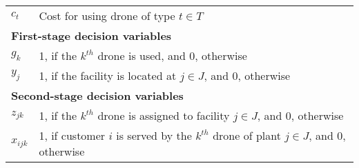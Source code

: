 \documentclass[preprint,review,11pt,authoryear]{elsarticle}
\begin{document}
\begin{table}[t]
{\begin{tabular}{ll}
$c_t$                             & Cost for using drone of type $t\in T$                                                     \\
\multicolumn{2}{l}{\textbf{First-stage decision variables}}                                                                   \\
$g_k$                             & 1, if the $k^{th}$ drone is used, and 0, otherwise                                        \\
$y_j$                             & 1, if the facility is located at $j\in J$, and 0, otherwise                               \\
\multicolumn{2}{l}{\textbf{Second-stage decision variables}}                                                                  \\
$z_{jk}$                          & 1, if the $k^{th}$ drone is assigned to facility $j\in J$, and 0, otherwise               \\
$x_{ijk}$                         & 1, if customer $i$ is served by the $k^{th}$ drone of plant $j\in J$, and 0, otherwise    \\
\bottomrule
\end{tabular}
}
\label{table:notation}
\end{table} 
\end{document}
